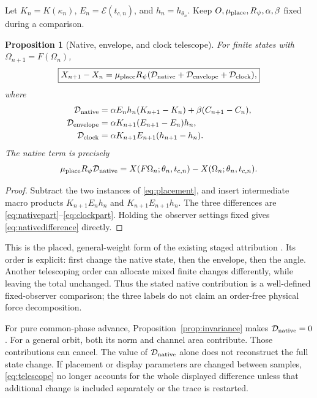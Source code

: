 \documentclass[11pt,a4paper]{article}
\numberwithin{equation}{section}
\newtheorem{proposition}{Proposition}[section]
\theoremstyle{definition}
\theoremstyle{remark}
\newcommand{\Dnat}{\mathcal D_{\rm native}}
\newcommand{\Denv}{\mathcal D_{\rm envelope}}
\newcommand{\Dclock}{\mathcal D_{\rm clock}}
\newcommand{\envelope}{\mathcal E}
\newcommand{\muplace}{\mu_{\rm place}}
\begin{document}
Let $K_n=K(\kappa_n)$, $E_n=\envelope(t_{c,n})$, and
$h_n=h_{\theta_n}$. Keep $O,\muplace,R_\psi,\alpha,\beta$ fixed during a
comparison.

\begin{proposition}[Native, envelope, and clock telescope]
\label{prop:telescope}
For finite states with $\Omega_{n+1}=F(\Omega_n)$,
\begin{equation}\label{eq:telescope}
\boxed{X_{n+1}-X_n=
\muplace R_\psi(\Dnat+\Denv+\Dclock),}
\end{equation}
where
\begin{align}
\Dnat&=\alpha E_nh_n(K_{n+1}-K_n)
                    +\beta(C_{n+1}-C_n),\label{eq:nativepart}\\
\Denv&=\alpha K_{n+1}(E_{n+1}-E_n)h_n,\label{eq:envelopepart}\\
\Dclock&=\alpha K_{n+1}E_{n+1}(h_{n+1}-h_n).
\label{eq:clockpart}
\end{align}
The native term is precisely
\begin{equation}\label{eq:nativedifference}
\muplace R_\psi\Dnat
=X(F\Omega_n;\theta_n,t_{c,n})
 -X(\Omega_n;\theta_n,t_{c,n}).
\end{equation}
\end{proposition}
\begin{proof}
Subtract the two instances of \eqref{eq:placement}, and insert intermediate
macro products $K_{n+1}E_nh_n$ and $K_{n+1}E_{n+1}h_n$. The three
differences are \eqref{eq:nativepart}--\eqref{eq:clockpart}. Holding the
observer settings fixed gives \eqref{eq:nativedifference} directly.
\end{proof}

This is the placed, general-weight form of the existing staged attribution
\cite[Section 8.2]{Central}. Its order is explicit: first change the native
state, then the envelope, then the angle. Another telescoping order can
allocate mixed finite changes differently, while leaving the total
unchanged. Thus the stated native contribution is a well-defined
fixed-observer comparison; the three labels do not claim an order-free
physical force decomposition.

For pure common-phase advance, Proposition~\ref{prop:invariance} makes
$\Dnat=0$. For a general orbit, both its norm and channel area contribute.
Those contributions can cancel. The value of $\Dnat$ alone does not
reconstruct the full state change. If placement or display parameters are
changed between samples, \eqref{eq:telescope} no longer accounts for the
whole displayed difference unless that additional change is included
separately or the trace is restarted.
\end{document}
